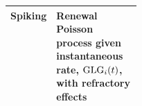 {\begin{tabularx}{\linewidth}{|p{0.22\linewidth}|X|}
\\\hline
 \textbf{Spiking} & Renewal Poisson process given instantaneous rate, ${\rm GLG}_{i}(t)$,  with refractory effects  \citep{ZilanyBruce:2007,Jackson:2003} \\\hline
\end{tabularx}
\vspace{2ex} 


}
